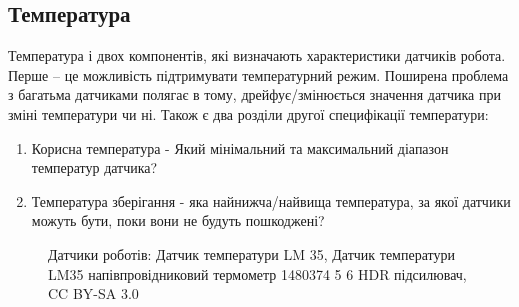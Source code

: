 \documentclass[a4paper,14pt]{extreport}
\begin{document}
\subsection{Температура}
Температура і двох компонентів, які визначають характеристики датчиків робота. Перше – це можливість підтримувати температурний режим. Поширена проблема з багатьма датчиками полягає в тому, дрейфує/змінюється значення датчика при зміні температури чи ні. Також є два розділи другої специфікації температури:\\
\begin{enumerate}
\item Корисна температура - Який мінімальний та максимальний діапазон температур датчика?
\item Температура зберігання - яка найнижча/найвища температура, за якої датчики можуть бути, поки вони не будуть пошкоджені?
\end{enumerate}

\begin{figure}[h!]
   \caption{Датчики роботів: Датчик температури LM 35, Датчик температури LM35 напівпровідниковий термометр 1480374 5 6 HDR підсилювач, CC BY-SA 3.0}
 \end{figure}
\end{document}
